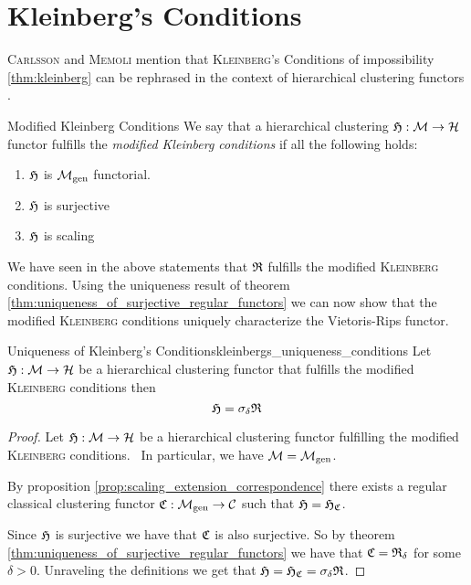 \section{Kleinberg's Conditions}

\textsc{Carlsson} and \textsc{Memoli} mention that \textsc{Kleinberg}'s Conditions of impossibility \ref{thm:kleinberg} can be rephrased in the context of hierarchical clustering functors \cite[Sec.~7.3.1]{Carlsson2010}.

\begin{definition}{Modified Kleinberg Conditions}{}
    We say that a hierarchical clustering $\mathfrak{H}: \mathcal{M} \to \mathcal{H}$ functor fulfills the \emph{modified Kleinberg conditions} if all the following holds:
    \begin{enumerate}
        \item $\mathfrak{H}$ is ${\mathcal{M}_\mathrm{gen}}$ functorial.
        \item $\mathfrak{H}$ is surjective
        \item $\mathfrak{H}$ is scaling
    \end{enumerate}
\end{definition}

We have seen in the above statements that $\mathfrak{R}$ fulfills the modified \textsc{Kleinberg} conditions.
Using the uniqueness result of theorem \ref{thm:uniqueness_of_surjective_regular_functors} we can now show that the modified \textsc{Kleinberg} conditions uniquely characterize the Vietoris-Rips functor.

\begin{theorem}{Uniqueness of Kleinberg's Conditions}{kleinbergs_uniqueness_conditions}
    Let $\mathfrak{H}: \mathcal{M} \to \mathcal{H}$ be a hierarchical clustering functor that fulfills the modified \textsc{Kleinberg} conditions then
    $$
    \mathfrak{H} = \sigma_\delta \mathfrak{R}
    $$
\end{theorem}

\begin{proof}
Let $\mathfrak{H}: \mathcal{M} \to \mathcal{H}$ be a hierarchical clustering functor fulfilling the modified \textsc{Kleinberg} conditions. \Ie\ In particular, we have $\mathcal{M} = {\mathcal{M}_\mathrm{gen}}$.

By proposition \ref{prop:scaling_extension_correspondence} there exists a regular classical clustering functor $\mathfrak{C}: {\mathcal{M}_\mathrm{gen}} \to \mathcal{C}$ such that $\mathfrak{H} = \mathfrak{H}_{\mathfrak{C}}$.

Since $\mathfrak{H}$ is surjective we have that $\mathfrak{C}$ is also surjective. So by theorem \ref{thm:uniqueness_of_surjective_regular_functors} we have that $\mathfrak{C} = \mathfrak{R}_\delta$ for some $\delta > 0$. Unraveling the definitions we get that $\mathfrak{H} = \mathfrak{H}_{\mathfrak{C}} = \sigma_\delta \mathfrak{R}$.
\end{proof}
